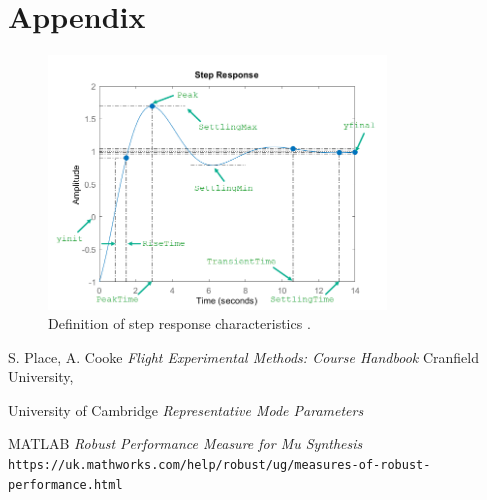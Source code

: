 \documentclass{article}
\begin{document}
\section{Appendix}

\begin{figure}[H]
    \centering
    \includegraphics[width=0.8\textwidth]{figures/step-characteristics.png}
    \caption{Definition of step response characteristics \cite{matlab}.}
    \label{fig:matlab_step_chics}
\end{figure}

\begin{thebibliography}{9}

    S. Place, A. Cooke
    \emph{Flight Experimental Methods: Course Handbook}
    Cranfield University,

    University of Cambridge
    \emph{Representative Mode Parameters}

    MATLAB
    \emph{Robust Performance Measure for Mu Synthesis}
    \texttt{https://uk.mathworks.com/help/robust/ug/measures-of-robust-performance.html}

\end{thebibliography}
\end{document}
